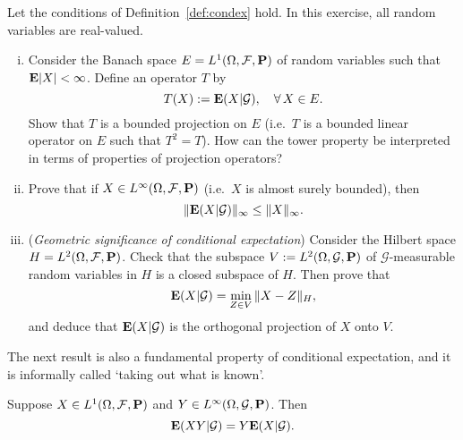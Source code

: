 \begin{exercise}
    Let the conditions of Definition~\ref{def:condex} hold. In this exercise, all random variables are real-valued.
    \begin{enumerate}[(i)]
        \item Consider the Banach space $E=L^1(\Omega,\mathcal{F},\mathbf{P})$ of random variables such that $\mathbf{E}|X|<\infty$. Define an operator $T$ by
        \begin{equation*}
            T(X) := \mathbf{E}(X|\mathcal{G}), \quad\forall\, X\in E.
        \end{equation*}
        Show that $T$ is a bounded projection on $E$ (i.e.\ $T$ is a bounded linear operator on $E$ such that $T^2=T$). How can the tower property be interpreted in terms of properties of projection operators?

        \item Prove that if $X\in L^\infty(\Omega,\mathcal{F},\mathbf{P})$ (i.e.\ $X$ is almost surely bounded), then
        \begin{equation*}
            \|\mathbf{E}(X|\mathcal{G})\|_\infty \le \|X\|_\infty.
        \end{equation*}

        \item (\emph{Geometric significance of conditional expectation}) Consider the Hilbert space $H=L^2(\Omega,\mathcal{F},\mathbf{P})$. Check that the subspace $V:=L^2(\Omega,\mathcal{G},\mathbf{P})$ of $\mathcal{G}$-measurable random variables in $H$ is a closed subspace of $H$. Then prove that
        \begin{equation*}
            \mathbf{E}(X|\mathcal{G}) = \min_{Z\in V}\|X-Z\|_{H},
        \end{equation*}
        and deduce that $\mathbf{E}(X|\mathcal{G})$ is the orthogonal projection of $X$ onto $V$.
    \end{enumerate}
\end{exercise}

The next result is also a fundamental property of conditional expectation, and it is informally called `taking out what is known'.
\begin{proposition}
\label{prop:take-out-known}
Suppose $X\in L^1(\Omega,\mathcal{F},\mathbf{P})$ and $Y\in L^\infty(\Omega,\mathcal{G},\mathbf{P})$. Then
\begin{equation}
\label{eq:take-out-known}
    \mathbf{E}(XY|\mathcal{G}) = Y \mathbf{E}(X|\mathcal{G}).
\end{equation}
\end{proposition}

